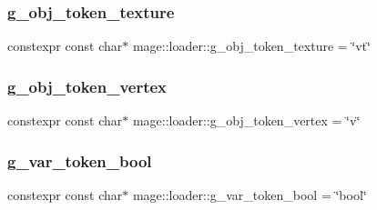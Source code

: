\hypertarget{namespacemage_1_1loader_a766d097bfa881dd65b9e7488a2b3d37c}{}\label{namespacemage_1_1loader_a766d097bfa881dd65b9e7488a2b3d37c} 
\subsubsection{\texorpdfstring{g\+\_\+obj\+\_\+token\+\_\+texture}{g\_obj\_token\_texture}}
{\footnotesize\ttfamily constexpr const char$\ast$ mage\+::loader\+::g\+\_\+obj\+\_\+token\+\_\+texture = \char`\"{}vt\char`\"{}}

\hypertarget{namespacemage_1_1loader_a5e1d583e5b5baf5d4135d254e3075342}{}\label{namespacemage_1_1loader_a5e1d583e5b5baf5d4135d254e3075342} 
\subsubsection{\texorpdfstring{g\+\_\+obj\+\_\+token\+\_\+vertex}{g\_obj\_token\_vertex}}
{\footnotesize\ttfamily constexpr const char$\ast$ mage\+::loader\+::g\+\_\+obj\+\_\+token\+\_\+vertex = \char`\"{}v\char`\"{}}

\hypertarget{namespacemage_1_1loader_af8ee37ed91ac28f044c159272c402c8f}{}\label{namespacemage_1_1loader_af8ee37ed91ac28f044c159272c402c8f} 
\subsubsection{\texorpdfstring{g\+\_\+var\+\_\+token\+\_\+bool}{g\_var\_token\_bool}}
{\footnotesize\ttfamily constexpr const char$\ast$ mage\+::loader\+::g\+\_\+var\+\_\+token\+\_\+bool = \char`\"{}bool\char`\"{}}

\hypertarget{namespacemage_1_1loader_a51fd34b486dfe1d203f7c7b897b2fd2c}{}\label{namespacemage_1_1loader_a51fd34b486dfe1d203f7c7b897b2fd2c} 
